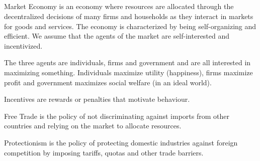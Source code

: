 \subsection{}

\begin{definition}
    Market Economy is an economy where resources are allocated through the decentralized decisions of many firms and households as they interact in markets for goods and services.
    The economy is characterized by being self-organizing and efficient.
    We assume that the agents of the market are self-interested and incentivized.
\end{definition}

The three agents are individuals, firms and government and are all interested in maximizing something.
Individuals maximize utility (happiness), firms maximize profit and government maximizes social welfare (in an ideal world).

\begin{definition}
    Incentives are rewards or penalties that motivate behaviour.
\end{definition}

\begin{definition}
    Free Trade is the policy of not discriminating against imports from other countries and relying on the market to allocate resources.
\end{definition}

\begin{definition}
    Protectionism is the policy of protecting domestic industries against foreign competition by imposing tariffs, quotas and other trade barriers.
\end{definition}

